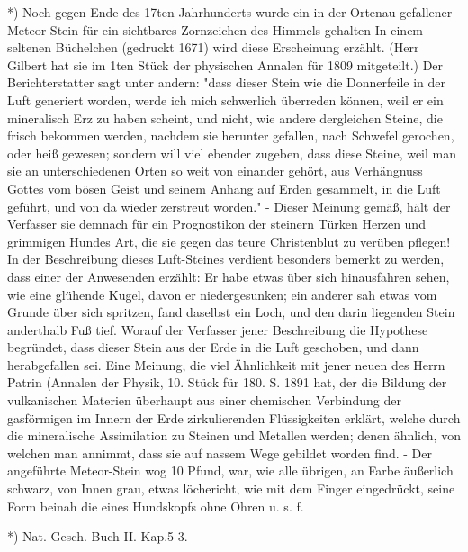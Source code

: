 \documentclass[a4paper, 11pt, oneside, polutonikogreek, german]{article}
\begin{document}
*) Noch gegen Ende des 17ten Jahrhunderts wurde ein in der Ortenau gefallener Meteor-Stein für ein sichtbares Zornzeichen des Himmels gehalten In einem seltenen Büchelchen (gedruckt 1671) wird diese Erscheinung erzählt. (Herr Gilbert hat sie im 1ten Stück der physischen Annalen für 1809 mitgeteilt.) Der Berichterstatter sagt unter andern: "dass dieser Stein wie die Donnerfeile in der Luft generiert worden, werde ich mich schwerlich überreden können, weil er ein mineralisch Erz zu haben scheint, und nicht, wie andere dergleichen Steine, die frisch bekommen werden, nachdem sie herunter gefallen, nach Schwefel gerochen, oder heiß gewesen; sondern will viel ebender zugeben, dass diese Steine, weil man sie an unterschiedenen Orten so weit von einander gehört, aus Verhängnuss Gottes vom bösen Geist und seinem Anhang auf Erden gesammelt, in die Luft geführt, und von da wieder zerstreut worden." - Dieser Meinung gemäß, hält der Verfasser sie demnach für ein Prognostikon der steinern Türken Herzen und grimmigen Hundes Art, die sie gegen das teure Christenblut zu verüben pflegen! In der Beschreibung dieses Luft-Steines verdient besonders bemerkt zu werden, dass einer der Anwesenden erzählt: Er habe etwas über sich hinausfahren sehen, wie eine glühende Kugel, davon er niedergesunken; ein anderer sah etwas vom Grunde über sich spritzen, fand daselbst ein Loch, und den darin liegenden Stein anderthalb Fuß tief. Worauf der Verfasser jener Beschreibung die Hypothese begründet, dass dieser Stein aus der Erde in die Luft geschoben, und dann herabgefallen sei. Eine Meinung, die viel Ähnlichkeit mit jener neuen des Herrn Patrin (Annalen der Physik, 10. Stück für 180. S. 1891 hat, der die Bildung der vulkanischen Materien überhaupt aus einer chemischen Verbindung der gasförmigen im Innern der Erde zirkulierenden Flüssigkeiten erklärt, welche durch die mineralische Assimilation zu Steinen und Metallen werden; denen ähnlich, von welchen man annimmt, dass sie auf nassem Wege gebildet worden find. - Der angeführte Meteor-Stein wog 10 Pfund, war, wie alle übrigen, an Farbe äußerlich schwarz, von Innen grau, etwas löchericht, wie mit dem Finger eingedrückt, seine Form beinah die eines Hundskopfs ohne Ohren u. s. f.

*) Nat. Gesch. Buch II. Kap.5 3.
\end{document}
